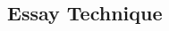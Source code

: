 \documentclass[a4paper]{article}
\begin{document}
\begin{multicols}{2}
\section{Essay Technique}







\end{multicols}
\end{document}
